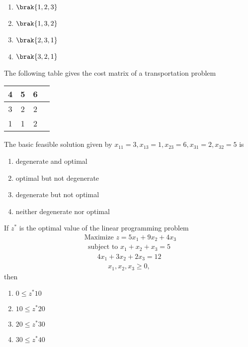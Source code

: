   \begin{multicols}{4}
      \begin{enumerate}
          \item $\brak{1,2,3}$
          \item $\brak{1,3,2}$
          \item $\brak{2,3,1}$
          \item $\brak{3,2,1}$
      \end{enumerate}
  \end{multicols}
  \item The following table gives the cost matrix of a transportation problem
\begin{table}[h!]    
        \centering
\begin{tabular}{|c|c|c|c|}
 \hline
 4 & 5 & 6 \\ \hline
  3 & 2 & 2 \\ \hline
  1 & 1 & 2 \\ \hline
\end{tabular}
        
    \end{table}
  The basic feasible solution given by $x_{11} =3 , x_{13}=1 , x_{23} =6,x_{31}=2,x_{32}=5$ is
  \begin{enumerate}
      \item degenerate and optimal
      \item optimal but not degenerate
      \item degenerate but not optimal
      \item neither degenerate nor optimal
  \end{enumerate}
  \item If $z^*$ is the optimal value of the linear programming problem
  \begin{align}
      \text{ Maximize } z = 5x_1 + 9x_2 + 4x_3
  \end{align}
  \begin{align}
      \text{subject to } x_1 + x_2 + x_3 =5 
  \end{align}
  \begin{align}
      4x_1 + 3x_2 + 2x_3 = 12
  \end{align}
  \begin{align}
      x_1,x_2,x_3\geq 0,
  \end{align}
  then 
  \begin{enumerate}
      \item $0\leq z^* 10$
       \item $10\leq z^* 20$
        \item $20\leq z^* 30$
         \item $30\leq z^* 40$\\
  \end{enumerate}
